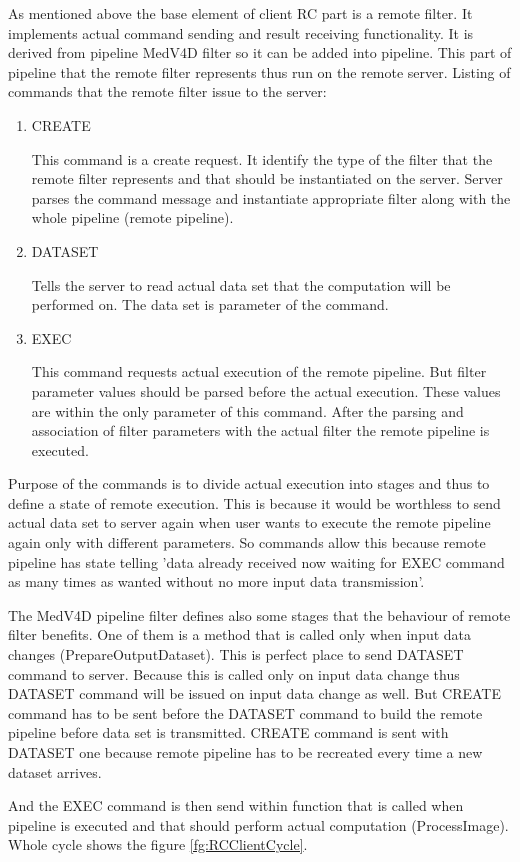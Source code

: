 As mentioned above the base element of client RC part is a remote filter.
It implements actual command sending and result receiving functionality.
It is derived from pipeline MedV4D filter so it can be added into pipeline.
This part of pipeline that the remote filter represents thus run on the remote server.
Listing of commands that the remote filter issue to the server:
\begin{enumerate}
  \item{CREATE}
  \par
  This command is a create request.
It identify the type of the filter that the remote filter represents and that should be instantiated on the server.
Server parses the command message and instantiate appropriate filter along with the whole pipeline (remote pipeline).

  \item{DATASET}
  \par
  Tells the server to read actual data set that the computation will be performed on.
The data set is parameter of the command.

  \item{EXEC}
\par
  This command requests actual execution of the remote pipeline.
But filter parameter values should be parsed before the actual execution.
These values are within the only parameter of this command.
After the parsing and association of filter parameters with the actual filter the remote pipeline is executed.
\end{enumerate}

\par
Purpose of the commands is to divide actual execution into stages and thus to define a state of remote execution.
This is because it would be worthless to send actual data set to server again when user wants to execute the remote pipeline again only with different parameters.
So commands allow this because remote pipeline has state telling 'data already received now waiting for EXEC command as many times as wanted without no more input data transmission'.
\par
The MedV4D pipeline filter defines also some stages that the behaviour of remote filter benefits.
One of them is a method that is called only when input data changes (PrepareOutputDataset).
This is perfect place to send DATASET command to server.
Because this is called only on input data change thus DATASET command will be issued on input data change as well.
But CREATE command has to be sent before the DATASET command to build the remote pipeline before data set is transmitted.
CREATE command is sent with DATASET one because remote pipeline has to be recreated every time a new dataset arrives.
\par
And the EXEC command is then send within function that is called when pipeline is executed and that should perform actual computation (ProcessImage).
Whole cycle shows the figure \ref{fg:RCClientCycle}.

